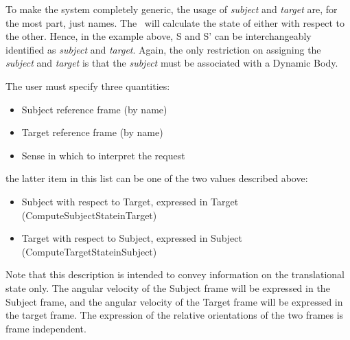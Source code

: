 To make the system completely generic, the usage of \textit{subject} and \textit{target} are, for the most part, just names.  The \RelativeDesc\ will calculate the state of either with respect to the other.  Hence, in the example above, S and S' can be interchangeably identified as \textit{subject} and \textit{target}.  Again, the only restriction on assigning the \textit{subject} and \textit{target} is that the \textit{subject} must be associated with a Dynamic Body.

The user must specify three quantities:
\begin{itemize}
\item{Subject reference frame (by name)}
\item{Target reference frame (by name)}
\item{Sense in which to interpret the request}
\end{itemize}

the latter item in this list can be one of the two values described above:
\begin{itemize}
\item{Subject with respect to Target, expressed in Target (ComputeSubjectStateinTarget)}
\item{Target with respect to Subject, expressed in Subject (ComputeTargetStateinSubject)}
\end{itemize}

Note that this description is intended to convey information on the translational state only.  The angular velocity of the Subject frame will be expressed in the Subject frame, and the angular velocity of the Target frame will be expressed in the target frame.  The expression of the relative orientations of the two frames is frame independent.
